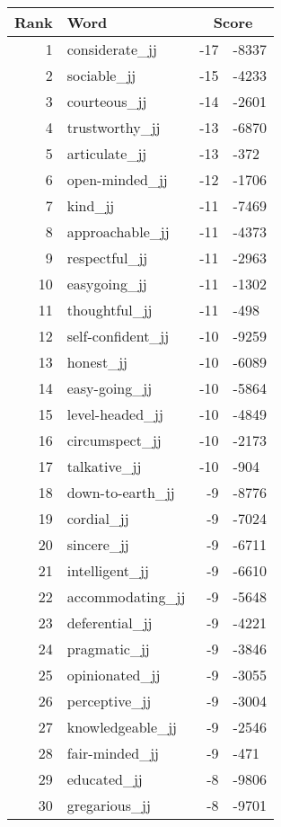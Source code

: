 \begin{longtable}[!htbp]{| rlr@{.}l |}
    \hline
    \textbf{Rank} & \textbf{Word} & \multicolumn{2}{c|}{\textbf{Score}} \\
    \hline
    \endhead
    1 & considerate\_jj & -17 & -8337 \\
    2 & sociable\_jj & -15 & -4233 \\
    3 & courteous\_jj & -14 & -2601 \\
    4 & trustworthy\_jj & -13 & -6870 \\
    5 & articulate\_jj & -13 & -372 \\
    6 & open-minded\_jj & -12 & -1706 \\
    7 & kind\_jj & -11 & -7469 \\
    8 & approachable\_jj & -11 & -4373 \\
    9 & respectful\_jj & -11 & -2963 \\
    10 & easygoing\_jj & -11 & -1302 \\
    11 & thoughtful\_jj & -11 & -498 \\
    12 & self-confident\_jj & -10 & -9259 \\
    13 & honest\_jj & -10 & -6089 \\
    14 & easy-going\_jj & -10 & -5864 \\
    15 & level-headed\_jj & -10 & -4849 \\
    16 & circumspect\_jj & -10 & -2173 \\
    17 & talkative\_jj & -10 & -904 \\
    18 & down-to-earth\_jj & -9 & -8776 \\
    19 & cordial\_jj & -9 & -7024 \\
    20 & sincere\_jj & -9 & -6711 \\
    21 & intelligent\_jj & -9 & -6610 \\
    22 & accommodating\_jj & -9 & -5648 \\
    23 & deferential\_jj & -9 & -4221 \\
    24 & pragmatic\_jj & -9 & -3846 \\
    25 & opinionated\_jj & -9 & -3055 \\
    26 & perceptive\_jj & -9 & -3004 \\
    27 & knowledgeable\_jj & -9 & -2546 \\
    28 & fair-minded\_jj & -9 & -471 \\
    29 & educated\_jj & -8 & -9806 \\
    30 & gregarious\_jj & -8 & -9701 \\

\end{longtable}
